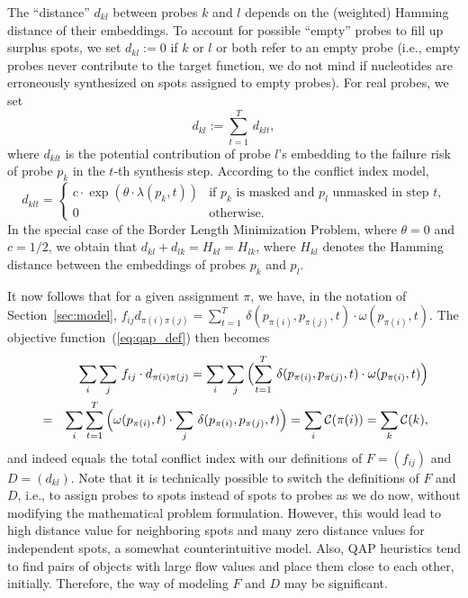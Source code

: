 \documentclass[english]{lni}
\begin{document}
The ``distance'' $d_{kl}$ between probes $k$ and $l$ depends on the (weighted) Hamming
distance of their embeddings. To account for possible ``empty'' probes to fill
up surplus spots, we set $d_{kl}:=0$ if $k$ or $l$ or both refer to an empty
probe (i.e., empty probes never contribute to the target function, we do not
mind if nucleotides are erroneously synthesized on spots assigned to empty
probes). For real probes, we set
\[ d_{kl} := \sum_{t=1}^T\, d_{klt}, \]
where $d_{klt}$ is the
potential contribution of probe $l$'s embedding to the failure risk of probe
$p_k$ in the $t$-th synthesis step. According to the conflict index model,
\[ d_{klt}  = \left\{ \begin{array}{ll}
    c \cdot \exp(\theta \cdot \lambda(p_k,t)) 
    & \mbox{if $p_k$ is masked and $p_l$ unmasked in step $t$,}\\
    0
    & \mbox{otherwise.}
  \end{array} \right.
\]
In the special case of the Border Length Minimization Problem, where
$\theta=0$ and $c=1/2$, we obtain that $d_{kl} + d_{lk} = H_{kl} = H_{lk}$,
where $H_{kl}$ denotes the  Hamming distance between the embeddings of probes
$p_k$ and $p_l$.

It now follows that for a given assignment $\pi$, we have, in the notation of
Section~\ref{sec:model}, 
$f_{ij} d_{\pi(i)\pi(j)} = \sum_{t=1}^T\, \delta(p_{\pi(i)},p_{\pi(j)},t) 
\cdot \omega(p_{\pi(i)},t)$. The objective
function~(\ref{eq:qap_def}) then becomes
\begin{eqnarray*}
  & & \sum_i \sum_j\, f_{ij} \cdot d_{\pi(i)\pi(j)} 
    = \sum_i \sum_j\, \Bigl( \sum_{t=1}^T\,  \delta(p_{\pi(i)},p_{\pi(j)},t)
      \cdot \omega(p_{\pi(i)},t) \Bigr)\\
  &=& \sum_i \sum_{t=1}^T\, \Bigl( \omega(p_{\pi(i)},t)
      \cdot \sum_j\,  \delta(p_{\pi(i)},p_{\pi(j)},t) \Bigr) 
    = \sum_i \mathcal{C}(\pi(i))
    = \sum_k \mathcal{C}(k),\\
\end{eqnarray*}
and indeed equals the total conflict index with our definitions of $F=(f_{ij})$
and $D=(d_{kl})$.
Note that it is technically possible to switch the definitions of $F$
and $D$, i.e., to assign probes to spots instead of spots to probes as we do now, 
without modifying the mathematical problem formulation. 
However, this would lead to high distance value for
neighboring spots and many zero distance values for independent spots, a somewhat
counterintuitive model. Also, QAP heuristics tend to find pairs of objects with
large flow values and place them close to each other, initially. Therefore, the
way of modeling $F$ and $D$ may be significant.
\end{document}

